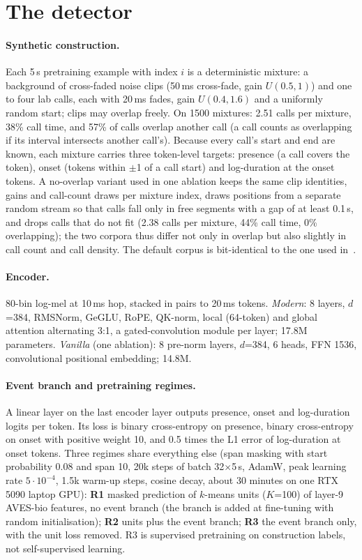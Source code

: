 \documentclass[10pt,twocolumn]{article}
\begin{document}
\section{The detector}
\label{sec:method}
\paragraph{Synthetic construction.} Each 5\,s pretraining example with index $i$ is a deterministic mixture: a background of cross-faded noise clips (50\,ms cross-fade, gain $U(0.5,1)$) and one to four lab calls, each with 20\,ms fades, gain $U(0.4,1.6)$ and a uniformly random start; clips may overlap freely. On 1500 mixtures: 2.51 calls per mixture, 38\% call time, and 57\% of calls overlap another call (a call counts as overlapping if its interval intersects another call's). Because every call's start and end are known, each mixture carries three token-level targets: presence (a call covers the token), onset (tokens within $\pm$1 of a call start) and log-duration at the onset tokens. A no-overlap variant used in one ablation keeps the same clip identities, gains and call-count draws per mixture index, draws positions from a separate random stream so that calls fall only in free segments with a gap of at least 0.1\,s, and drops calls that do not fit (2.38 calls per mixture, 44\% call time, 0\% overlapping); the two corpora thus differ not only in overlap but also slightly in call count and call density. The default corpus is bit-identical to the one used in~\citep{sheipak2026what}.
\paragraph{Encoder.} 80-bin log-mel at 10\,ms hop, stacked in pairs to 20\,ms tokens. \emph{Modern}: 8 layers, $d$=384, RMSNorm, GeGLU, RoPE, QK-norm, local (64-token) and global attention alternating 3:1, a gated-convolution module per layer; 17.8M parameters. \emph{Vanilla} (one ablation): 8 pre-norm layers, $d$=384, 6 heads, FFN 1536, convolutional positional embedding; 14.8M.
\paragraph{Event branch and pretraining regimes.} A linear layer on the last encoder layer outputs presence, onset and log-duration logits per token. Its loss is binary cross-entropy on presence, binary cross-entropy on onset with positive weight 10, and 0.5 times the L1 error of log-duration at onset tokens. Three regimes share everything else (span masking with start probability 0.08 and span 10, 20k steps of batch 32$\times$5\,s, AdamW, peak learning rate $5\cdot10^{-4}$, 1.5k warm-up steps, cosine decay, about 30 minutes on one RTX 5090 laptop GPU): \textbf{R1} masked prediction of $k$-means units ($K$=100) of layer-9 AVES-bio features, no event branch (the branch is added at fine-tuning with random initialisation); \textbf{R2} units plus the event branch; \textbf{R3} the event branch only, with the unit loss removed. R3 is supervised pretraining on construction labels, not self-supervised learning.
\end{document}
